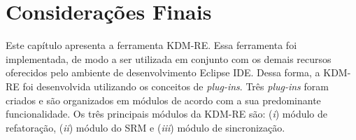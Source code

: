 



\section{Considerações Finais}

Este capítulo apresenta a ferramenta KDM-RE. Essa ferramenta foi implementada, de modo a ser utilizada em conjunto com os demais recursos oferecidos pelo ambiente de desenvolvimento Eclipse IDE. Dessa forma, a KDM-RE foi desenvolvida utilizando os conceitos de \textit{plug-ins}. Três \textit{plug-ins} foram criados e são organizados em módulos de acordo com a sua predominante funcionalidade. Os três principais módulos da KDM-RE são: (\textit{i}) módulo de refatoração, (\textit{ii}) módulo do SRM e (\textit{iii}) módulo de sincronização. 

